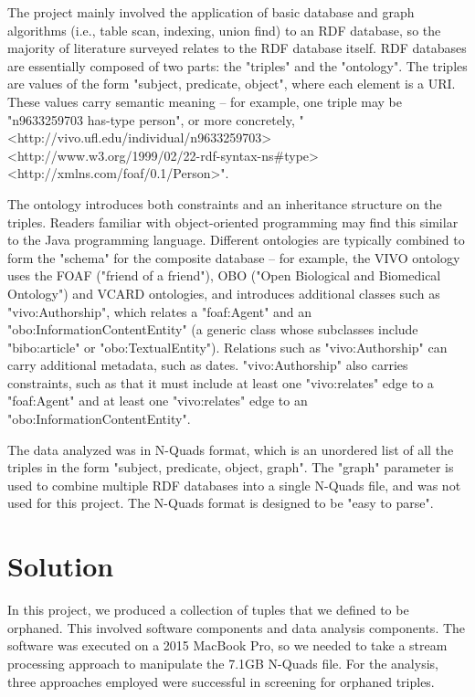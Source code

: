 \documentclass[11pt]{article}
\begin{document}
The project mainly involved the application of basic database and graph algorithms (i.e., table scan, indexing, union find) to an RDF database, so the majority of literature surveyed relates to the RDF database itself. RDF databases are essentially composed of two parts: the "triples" and the "ontology". The triples are values of the form "subject, predicate, object", where each element is a URI. These values carry semantic meaning -- for example, one triple may be "n9633259703 has-type person", or more concretely, "<http://vivo.ufl.edu/individual/n9633259703> <http://www.w3.org/1999/02/22-rdf-syntax-ns\#type> <http://xmlns.com/foaf/0.1/Person>".

The ontology introduces both constraints and an inheritance structure on the triples. Readers familiar with object-oriented programming may find this similar to the Java programming language. Different ontologies are typically combined to form the "schema" for the composite database -- for example, the VIVO ontology uses the FOAF ("friend of a friend"), OBO ("Open Biological and Biomedical Ontology") and VCARD ontologies, and introduces additional classes such as "vivo:Authorship", which relates a "foaf:Agent" and an "obo:InformationContentEntity" (a generic class whose subclasses include "bibo:article" or "obo:TextualEntity"). Relations such as "vivo:Authorship" can carry additional metadata, such as dates. "vivo:Authorship" also carries constraints, such as that it must include at least one "vivo:relates" edge to a "foaf:Agent" and at least one "vivo:relates" edge to an "obo:InformationContentEntity".

The data analyzed was in N-Quads format, which is an unordered list of all the triples in the form "subject, predicate, object, graph". The "graph" parameter is used to combine multiple RDF databases into a single N-Quads file, and was not used for this project. The N-Quads format is designed to be "easy to parse".

\section*{Solution}
In this project, we produced a collection of tuples that we defined to be orphaned. This involved software components and data analysis components. The software was executed on a 2015 MacBook Pro, so we needed to take a stream processing approach to manipulate the 7.1GB N-Quads file. For the analysis, three approaches employed were successful in screening for orphaned triples.
\end{document}
